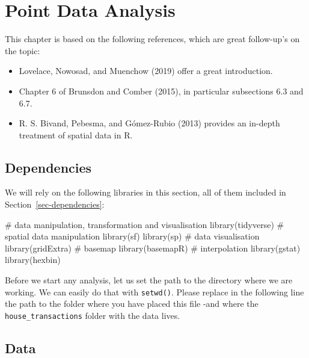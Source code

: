 \documentclass[
  letterpaper,
  DIV=11,
  numbers=noendperiod,
  oneside]{scrreprt}
\newenvironment{Shaded}{\begin{snugshade}}{\end{snugshade}}
\newcommand{\CommentTok}[1]{\textcolor[rgb]{0.37,0.37,0.37}{#1}}
\newcommand{\FunctionTok}[1]{\textcolor[rgb]{0.28,0.35,0.67}{#1}}
\newcommand{\NormalTok}[1]{\textcolor[rgb]{0.00,0.23,0.31}{#1}}
\providecommand{\tightlist}{%
  \setlength{\itemsep}{0pt}\setlength{\parskip}{0pt}}\usepackage{longtable,booktabs,array}
\begin{document}

\chapter{Point Data Analysis}\label{sec-chp4}

This chapter is based on the following references, which are great
follow-up's on the topic:

\begin{itemize}
\tightlist
\item
  Lovelace, Nowosad, and Muenchow (2019) offer a great introduction.
\item
  Chapter 6 of Brunsdon and Comber (2015), in particular subsections 6.3
  and 6.7.
\item
  R. S. Bivand, Pebesma, and Gómez-Rubio (2013) provides an in-depth
  treatment of spatial data in R.
\end{itemize}

\section{Dependencies}\label{dependencies-1}

We will rely on the following libraries in this section, all of them
included in Section~\ref{sec-dependencies}:

\begin{Shaded}
\begin{Highlighting}[]
\CommentTok{\# data manipulation, transformation and visualisation}
\FunctionTok{library}\NormalTok{(tidyverse)}
\CommentTok{\# spatial data manipulation}
\FunctionTok{library}\NormalTok{(sf)}
\FunctionTok{library}\NormalTok{(sp)}
\CommentTok{\# data visualisation}
\FunctionTok{library}\NormalTok{(gridExtra)}
\CommentTok{\# basemap}
\FunctionTok{library}\NormalTok{(basemapR)}
\CommentTok{\# interpolation}
\FunctionTok{library}\NormalTok{(gstat)}
\FunctionTok{library}\NormalTok{(hexbin)}
\end{Highlighting}
\end{Shaded}

Before we start any analysis, let us set the path to the directory where
we are working. We can easily do that with \texttt{setwd()}. Please
replace in the following line the path to the folder where you have
placed this file -and where the \texttt{house\_transactions} folder with
the data lives.

\section{Data}\label{data}
\end{document}
